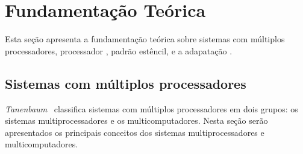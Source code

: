 
%


\chapter{Fundamentação Teórica}
\label{cap:fundamentacao_teorica}


Esta seção apresenta a fundamentação teórica sobre sistemas com múltiplos processadores, processador \manycore \mppa, padrão estêncil, \fw \pskel e a adapatação \pskelmppa.

\section{Sistemas com múltiplos processadores}
\label{sec:multicpu}

\textit{Tanenbaum}~\cite{Tanenbaum:2014:MOS:2655363} classifica sistemas com múltiplos processadores em dois grupos: os sistemas multiprocessadores e os multicomputadores. Nesta seção serão apresentados os principais conceitos dos sistemas multiprocessadores e multicomputadores.

